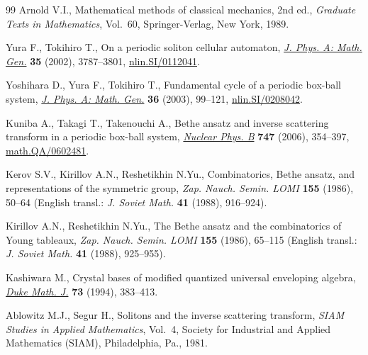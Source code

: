 \documentclass[11pt]{article}
\begin{document}
\begin{thebibliography}{99}
Arnold V.I.,
Mathematical methods of classical mechanics, 2nd ed.,
{\it Graduate Texts in Mathematics}, Vol.~60, Springer-Verlag, New York, 1989.


Yura F., Tokihiro T.,
On a periodic soliton cellular automaton,
\href{http://dx.doi.org/10.1088/0305-4470/35/16/317}{{\it J. Phys. A: Math. Gen.}} {\bf 35} (2002), 3787--3801,
\href{http://arxiv.org/abs/nlin.SI/0112041}{nlin.SI/0112041}.

Yoshihara D., Yura F., Tokihiro T.,
Fundamental cycle of a periodic box-ball system,
\href{http://dx.doi.org/10.1088/0305-4470/36/1/307}{{\it J. Phys. A: Math. Gen.}} {\bf 36} (2003), 99--121,
\href{http://arxiv.org/abs/nlin.SI/0208042}{nlin.SI/0208042}.


Kuniba A., Takagi T., Takenouchi A.,
Bethe ansatz and inverse scattering transform in a periodic box-ball system,
\href{http://dx.doi.org/10.1016/j.nuclphysb.2006.04.003}{{\it Nuclear Phys. B}} {\bf 747}  (2006), 354--397,
\href{http://arxiv.org/abs/math.QA/0602481}{math.QA/0602481}.

Kerov S.V., Kirillov A.N., Reshetikhin N.Yu.,
Combinatorics, Bethe ansatz, and representations of the symmetric group,
{\it Zap. Nauch. Semin. LOMI} {\bf 155} (1986), 50--64 (English transl.: {\it J. Soviet Math.} {\bf 41} (1988),  916--924).

Kirillov A.N., Reshetikhin N.Yu.,
The Bethe ansatz and the combinatorics of Young tableaux,
{\it Zap. Nauch. Semin. LOMI} {\bf 155} (1986), 65--115
(English transl.: {\it J. Soviet Math.} {\bf 41} (1988), 925--955).


Kashiwara M.,
Crystal bases of modif\/ied quantized universal enveloping algebra,
\href{http://dx.doi.org/10.1215/S0012-7094-94-07317-1}{{\it Duke  Math. J.}}  {\bf 73} (1994), 383--413.


Ablowitz M.J., Segur H.,
Solitons and the inverse scattering transform,
{\it SIAM Studies in Applied Mathematics}, Vol.~4, Society for Industrial and Applied Mathematics (SIAM), Philadelphia, Pa., 1981.


\end{thebibliography}
\end{document}
